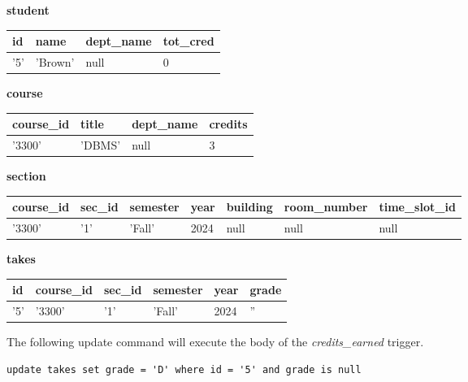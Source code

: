 \documentclass[12pt]{exam}
\begin{document}
\begin{questions}
\begin{samepage}
\begin{checkboxes}
\textbf{student}

\begin{tabular}{|l|l|l|l|}
\hline
id & name & dept\_name & tot\_cred \\
\hline
'5' & 'Brown' & null & 0 \\
\hline
\end{tabular}

\textbf{course}

\begin{tabular}{|l|l|l|l|}
\hline
course\_id & title & dept\_name & credits \\
\hline
'3300' & 'DBMS' & null & 3 \\
\hline
\end{tabular}

\textbf{section}

\begin{tabular}{|l|l|l|l|l|l|l|}
\hline
course\_id & sec\_id & semester & year & building & room\_number & time\_slot\_id \\
\hline
'3300' & '1' & 'Fall' & 2024 & null & null & null \\
\hline
\end{tabular}

\textbf{takes}

\begin{tabular}{|l|l|l|l|l|l|}
\hline
id & course\_id & sec\_id & semester & year & grade \\
\hline
'5' & '3300' & '1' & 'Fall' & 2024 & '' \\
\hline
\end{tabular}

The following update command will execute the body of the \textit{credits\_earned} trigger.
\begin{verbatim}
update takes set grade = 'D' where id = '5' and grade is null
\end{verbatim}
\end{checkboxes}
\end{samepage}


\end{questions}
\end{document}
